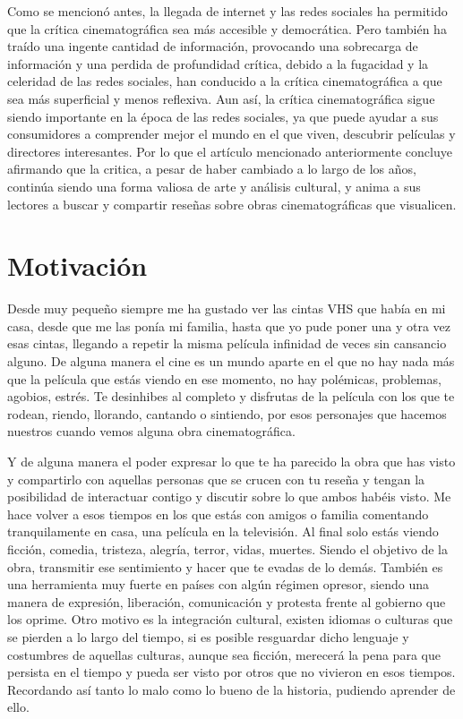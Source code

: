 Como se mencionó antes, la llegada de internet y las redes sociales ha permitido que la crítica cinematográfica sea más accesible y democrática. Pero también ha traído una ingente cantidad de información, provocando una sobrecarga de información y una perdida de profundidad crítica, debido a la fugacidad y la celeridad de las redes sociales, han conducido a la crítica cinematográfica a que sea más superficial y menos reflexiva. Aun así, la crítica cinematográfica sigue siendo importante en la época de las redes sociales, ya que puede ayudar a sus consumidores a comprender mejor el mundo en el que viven, descubrir películas y directores interesantes. Por lo que el artículo mencionado anteriormente concluye afirmando que la critica, a pesar de haber cambiado a lo largo de los años, continúa siendo una forma valiosa de arte y análisis cultural, y anima a sus lectores a buscar y compartir reseñas sobre obras cinematográficas que visualicen.

\section{Motivación}

Desde muy pequeño siempre me ha gustado ver las cintas VHS que había en mi casa, desde que me las ponía mi familia, hasta que yo pude poner una y otra vez esas cintas, llegando a repetir la misma película infinidad de veces sin cansancio alguno. De alguna manera el cine es un mundo aparte en el que no hay nada más que la película que estás viendo en ese momento, no hay polémicas, problemas, agobios, estrés. Te desinhibes al completo y disfrutas de la película con los que te rodean, riendo, llorando, cantando o sintiendo, por esos personajes que hacemos nuestros cuando vemos alguna obra cinematográfica. 

Y de alguna manera el poder expresar lo que te ha parecido la obra que has visto y compartirlo con aquellas personas que se crucen con tu reseña y tengan la posibilidad de interactuar contigo y discutir sobre lo que ambos habéis visto. Me hace volver a esos tiempos en los que estás con amigos o familia comentando tranquilamente en casa, una película en la televisión. Al final solo estás viendo ficción, comedia, tristeza, alegría, terror, vidas, muertes. Siendo el objetivo de la obra, transmitir ese sentimiento y hacer que te evadas de lo demás. También es una herramienta muy fuerte en países con algún régimen opresor, siendo una manera de expresión, liberación, comunicación y protesta frente al gobierno que los oprime. Otro motivo es la integración cultural, existen idiomas o culturas que se pierden a lo largo del tiempo, si es posible resguardar dicho lenguaje y costumbres de aquellas culturas, aunque sea ficción, merecerá la pena para que persista en el tiempo y pueda ser visto por otros que no vivieron en esos tiempos. Recordando así tanto lo malo como lo bueno de la historia, pudiendo aprender de ello.

